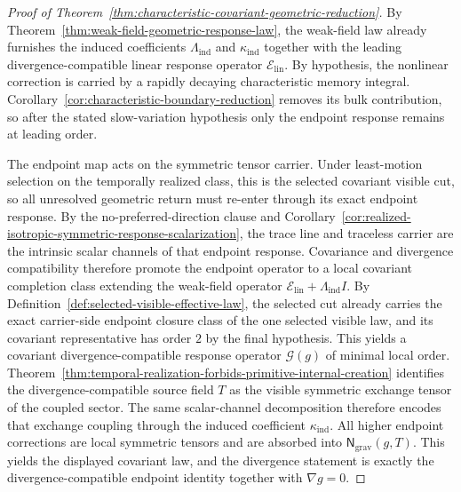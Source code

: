 \begin{proof}[Proof of Theorem~\ref{thm:characteristic-covariant-geometric-reduction}]
\label{proof:thm:characteristic-covariant-geometric-reduction}
By Theorem~\ref{thm:weak-field-geometric-response-law}, the weak-field law
already furnishes the induced coefficients \(\Lambda_{\mathrm{ind}}\) and
\(\kappa_{\mathrm{ind}}\) together with the leading divergence-compatible
linear response operator \(\mathcal E_{\mathrm{lin}}\). By hypothesis, the
nonlinear correction is carried by a rapidly decaying characteristic memory
integral. Corollary~\ref{cor:characteristic-boundary-reduction} removes its
bulk contribution, so after the stated slow-variation hypothesis only the
endpoint response remains at leading order.

The endpoint map acts on the symmetric tensor carrier. Under least-motion
selection on the temporally realized class, this is the selected covariant
visible cut, so all
unresolved geometric return must re-enter through its exact endpoint response.
By the no-preferred-direction clause and
Corollary~\ref{cor:realized-isotropic-symmetric-response-scalarization}, the
trace line and traceless carrier are the intrinsic scalar channels of that
endpoint response. Covariance and divergence compatibility therefore promote
the endpoint operator to a local covariant completion class extending the
weak-field operator \(\mathcal E_{\mathrm{lin}}+\Lambda_{\mathrm{ind}}I\). By
Definition~\ref{def:selected-visible-effective-law}, the selected cut already
carries the exact carrier-side endpoint closure class of the one selected
visible law, and its covariant representative has order \(2\) by the final
hypothesis. This yields a covariant
divergence-compatible response operator \(\mathcal G(g)\) of minimal local
order. Theorem~\ref{thm:temporal-realization-forbids-primitive-internal-creation}
identifies the divergence-compatible source field \(T\) as the visible
symmetric exchange tensor of the coupled sector. The same
scalar-channel decomposition therefore encodes that exchange coupling through
the induced coefficient
\(\kappa_{\mathrm{ind}}\). All higher endpoint corrections are local symmetric
tensors and are absorbed into \(\mathsf N_{\mathrm{grav}}(g,T)\). This yields
the displayed covariant law, and the divergence statement is exactly the
divergence-compatible endpoint identity together with \(\nabla g=0\).
\end{proof}

